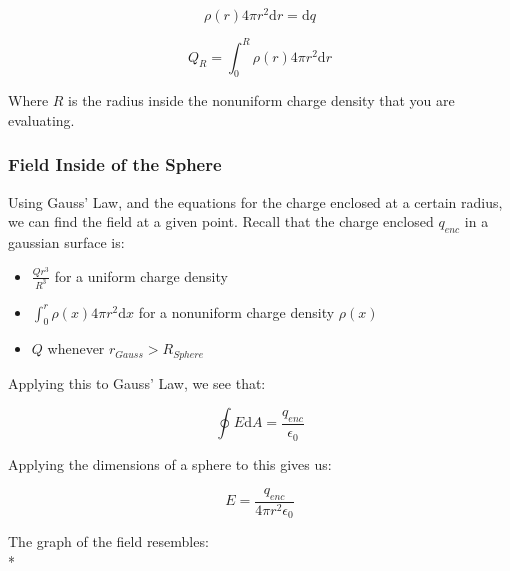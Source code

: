 \documentclass[a4paper,12pt]{article}
\begin{document}
							\begin{equation*}
									\rho(r) 4 \pi r^{2} \mathrm{d}r = \mathrm{d}q
							\end{equation*}

							\begin{equation*}
									Q_{R} = \int_{0}^{R} \rho(r) 4 \pi r^{2} \mathrm{d}r 
							\end{equation*}

							Where $R$ is the radius inside the nonuniform charge density that you are evaluating.

						\subsubsection{Field Inside of the Sphere}
							Using Gauss' Law, and the equations for the charge enclosed at a certain radius, we can find the field at a given point. Recall that the charge enclosed $q_{enc}$ in a gaussian surface is:
							\begin{itemize}
									\item $\frac{Qr^{3}}{R^{3}}$ for a uniform charge density
									\item $\int_{0}^{r} \rho(x) 4 \pi r^{2} \mathrm{d}x$ for a nonuniform charge density $\rho(x)$ 
									\item $Q$ whenever $r_{Gauss} > R_{Sphere}$
							\end{itemize}
							
							Applying this to Gauss' Law, we see that:

							\begin{equation*}
									\oint E \mathrm{d}A = \frac{q_{enc}}{\epsilon_{0}}
							\end{equation*}

							Applying the dimensions of a sphere to this gives us:

							\begin{equation*}
									E = \frac{q_{enc}}{4 \pi r^{2} \epsilon_{0}}
							\end{equation*}

							The graph of the field resembles:\\*
\end{document}
